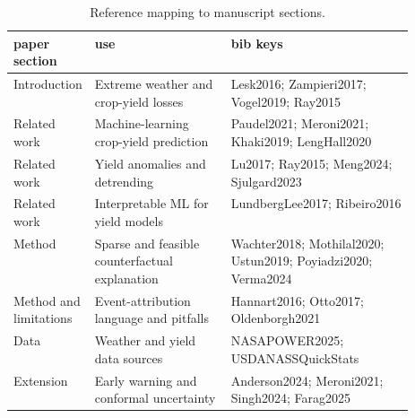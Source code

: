 \begin{table}[H]
\centering
\caption{Reference mapping to manuscript sections.}
\label{tab:reference_mapping}
\small
\renewcommand{\arraystretch}{1.15}
\begin{tabularx}{\linewidth}{@{}>{\raggedright\arraybackslash}p{0.18\linewidth}>{\raggedright\arraybackslash}p{0.34\linewidth}X@{}}
\toprule
paper section & use & bib keys \\
\midrule
Introduction & Extreme weather and crop-yield losses & Lesk2016; Zampieri2017; Vogel2019; Ray2015 \\
Related work & Machine-learning crop-yield prediction & Paudel2021; Meroni2021; Khaki2019; LengHall2020 \\
Related work & Yield anomalies and detrending & Lu2017; Ray2015; Meng2024; Sjulgard2023 \\
Related work & Interpretable ML for yield models & LundbergLee2017; Ribeiro2016 \\
Method & Sparse and feasible counterfactual explanation & Wachter2018; Mothilal2020; Ustun2019; Poyiadzi2020; Verma2024 \\
Method and limitations & Event-attribution language and pitfalls & Hannart2016; Otto2017; Oldenborgh2021 \\
Data & Weather and yield data sources & NASAPOWER2025; USDANASSQuickStats \\
Extension & Early warning and conformal uncertainty & Anderson2024; Meroni2021; Singh2024; Farag2025 \\
\bottomrule
\end{tabularx}
\end{table}

